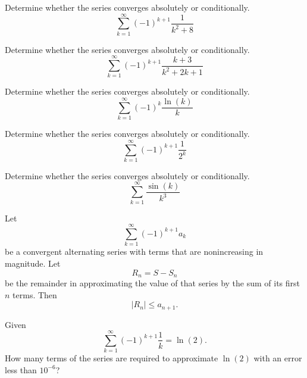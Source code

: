 \documentclass[compacto,10pt,comentarios]{aleph-notas}
\begin{document}
\begin{ejer}
    Determine whether the series converges absolutely or conditionally.
    $$
        \sum_{k=1}^{\infty} (-1)^{k+1} \frac{1}{k^2 + 8}
    $$
\end{ejer}

\begin{ejer}
    Determine whether the series converges absolutely or conditionally.
    $$
        \sum_{k=1}^{\infty} (-1)^{k+1} \frac{k+3}{k^2 + 2k + 1}
    $$
\end{ejer}

\begin{ejer}
    Determine whether the series converges absolutely or conditionally.
    $$
        \sum_{k=1}^{\infty} (-1)^{k} \frac{\ln(k)}{k}
    $$
\end{ejer}

\begin{ejer}
    Determine whether the series converges absolutely or conditionally.
    $$
        \sum_{k=1}^{\infty} (-1)^{k+1} \frac{1}{2^{k}}
    $$
\end{ejer}

\begin{ejer}
    Determine whether the series converges absolutely or conditionally.
    $$
        \sum_{k=1}^{\infty} \frac{\sin(k)}{k^3}
    $$
\end{ejer}

\begin{teo}
    Let
    $$
        \sum_{k=1}^{\infty} (-1)^{k+1} a_k
    $$
    be a convergent alternating series with terms that are nonincreasing in magnitude. Let
    $$
        R_n = S - S_n
    $$
    be the remainder in approximating the value of that series by the sum of its first $n$ terms.
    Then
    $$
        |R_n| \leq a_{n+1}.
    $$
\end{teo}

\begin{ejer}
    Given
    $$
        \sum_{k=1}^{\infty} (-1)^{k+1} \frac{1}{k} = \ln(2).
    $$
    How many terms of the series are required to approximate $\ln(2)$ with an error less than $10^{-6}$?
\end{ejer}
\end{document}

